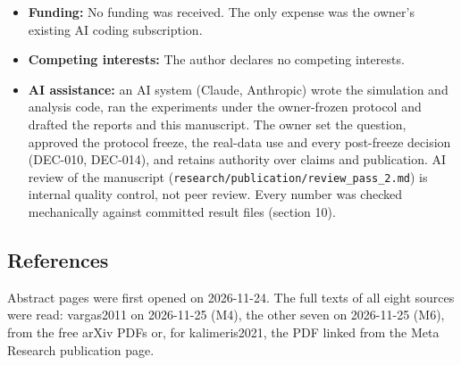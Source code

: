 \documentclass[
]{article}
\providecommand{\tightlist}{%
  \setlength{\itemsep}{0pt}\setlength{\parskip}{0pt}}
\begin{document}
\begin{itemize}
\tightlist
\item
  \textbf{Funding:} No funding was received. The only expense was the
  owner's existing AI coding subscription.
\item
  \textbf{Competing interests:} The author declares no competing
  interests.
\item
  \textbf{AI assistance:} an AI system (Claude, Anthropic) wrote the
  simulation and analysis code, ran the experiments under the
  owner-frozen protocol and drafted the reports and this manuscript. The
  owner set the question, approved the protocol freeze, the real-data
  use and every post-freeze decision (DEC-010, DEC-014), and retains
  authority over claims and publication. AI review of the manuscript
  (\texttt{research/publication/review\_pass\_2.md}) is internal quality
  control, not peer review. Every number was checked mechanically
  against committed result files (section 10).
\end{itemize}

\subsection{References}\label{references}

Abstract pages were first opened on 2026-11-24. The full texts of all
eight sources were read: vargas2011 on 2026-11-25 (M4), the other seven
on 2026-11-25 (M6), from the free arXiv PDFs or, for kalimeris2021, the
PDF linked from the Meta Research publication page.
\end{document}
